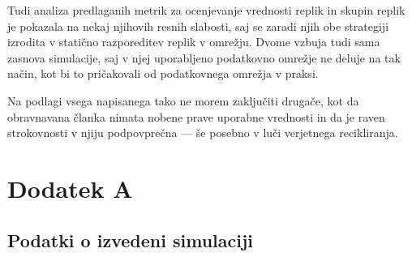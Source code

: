 \documentclass[a4paper, 12pt]{book}
\begin{document}
Tudi analiza predlaganih metrik za ocenjevanje vrednosti replik in skupin
replik je pokazala na nekaj njihovih resnih slabosti, saj se zaradi njih
obe strategiji izrodita v statično razporeditev replik v omrežju. Dvome
vzbuja tudi sama zasnova simulacije, saj v njej uporabljeno podatkovno omrežje
ne deluje na tak način, kot bi to pričakovali od podatkovnega omrežja v
praksi.

Na podlagi vsega napisanega tako ne morem zaključiti drugače, kot da
obravnavana članka nimata nobene prave uporabne vrednosti in da je raven
strokovnosti v njiju podpovprečna --- še posebno v luči verjetnega
recikliranja.



\chapter*{Dodatek A}
\section*{Podatki o izvedeni simulaciji}
\end{document}
